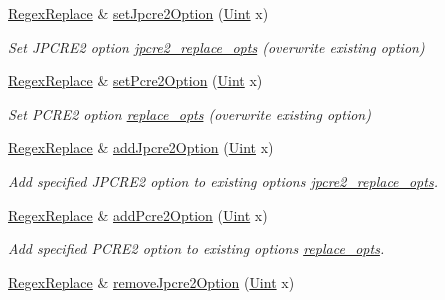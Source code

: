 \begin{DoxyCompactItemize}
\hyperlink{classjpcre2_1_1RegexReplace}{Regex\+Replace} \& \hyperlink{classjpcre2_1_1RegexReplace_a745ab0b979035214a83ed0a04686ef6a}{set\+Jpcre2\+Option} (\hyperlink{namespacejpcre2_a078242d38221a13fb3543b9edd78c099}{Uint} x)
\begin{DoxyCompactList}\small\item\em Set J\+P\+C\+R\+E2 option \hyperlink{classjpcre2_1_1RegexReplace_acf13bcb16918df4b7bcaa7e49a1c7d59}{jpcre2\+\_\+replace\+\_\+opts} (overwrite existing option) \end{DoxyCompactList}\item 
\hyperlink{classjpcre2_1_1RegexReplace}{Regex\+Replace} \& \hyperlink{classjpcre2_1_1RegexReplace_aec36272d351fdc3a8cb02a4a3efea5a2}{set\+Pcre2\+Option} (\hyperlink{namespacejpcre2_a078242d38221a13fb3543b9edd78c099}{Uint} x)
\begin{DoxyCompactList}\small\item\em Set P\+C\+R\+E2 option \hyperlink{classjpcre2_1_1RegexReplace_afc79699cfcad8b7cbb26864b6b67cdc7}{replace\+\_\+opts} (overwrite existing option) \end{DoxyCompactList}\item 
\hyperlink{classjpcre2_1_1RegexReplace}{Regex\+Replace} \& \hyperlink{classjpcre2_1_1RegexReplace_a3f86b1e11d08d0153a08244771e59061}{add\+Jpcre2\+Option} (\hyperlink{namespacejpcre2_a078242d38221a13fb3543b9edd78c099}{Uint} x)
\begin{DoxyCompactList}\small\item\em Add specified J\+P\+C\+R\+E2 option to existing options \hyperlink{classjpcre2_1_1RegexReplace_acf13bcb16918df4b7bcaa7e49a1c7d59}{jpcre2\+\_\+replace\+\_\+opts}. \end{DoxyCompactList}\item 
\hyperlink{classjpcre2_1_1RegexReplace}{Regex\+Replace} \& \hyperlink{classjpcre2_1_1RegexReplace_a3cfd03568b23bebcbb530a2c120b5d33}{add\+Pcre2\+Option} (\hyperlink{namespacejpcre2_a078242d38221a13fb3543b9edd78c099}{Uint} x)
\begin{DoxyCompactList}\small\item\em Add specified P\+C\+R\+E2 option to existing options \hyperlink{classjpcre2_1_1RegexReplace_afc79699cfcad8b7cbb26864b6b67cdc7}{replace\+\_\+opts}. \end{DoxyCompactList}\item 
\hyperlink{classjpcre2_1_1RegexReplace}{Regex\+Replace} \& \hyperlink{classjpcre2_1_1RegexReplace_a6fbfd673dbb865e6248bc527ba45f2f7}{remove\+Jpcre2\+Option} (\hyperlink{namespacejpcre2_a078242d38221a13fb3543b9edd78c099}{Uint} x)

\end{DoxyCompactItemize}

